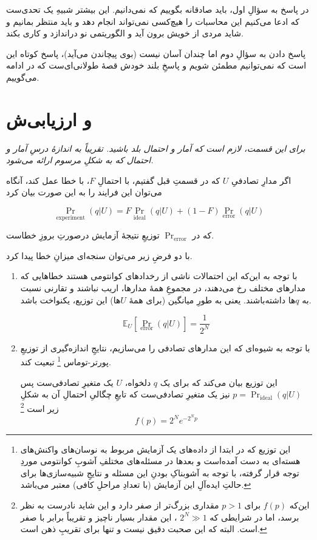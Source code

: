 \documentclass[11pt]{article}
\begin{document}
در پاسخ به سؤالِ اول، باید صادقانه بگوییم که نمی‌دانیم.
\cite{aaronson}
این بیشتر شبیهِ یک تحدی‌ست که ادعا می‌کنیم این محاسبات را هیچ‌کسی نمی‌تواند انجام دهد و باید منتظر بمانیم و شاید مردی از خویش برون آید و الگوریتمی نو دراندازد و کاری بکند.

پاسخ دادن به سؤالِ دوم اما چندان آسان نیست (بوی پیچاندن می‌آید)، پاسخ کوتاه این است که نمی‌توانیم مطمئن شویم \cite{aaronsonfaq} و پاسخِ بلند خودش قصهٔ طولانی‌ای‌ست که در ادامه می‌گوییم.
\section{و ارزیابی‌ش}
\begin{center}
\begin{minipage}[H]{0.6\textwidth}
\emph{
برای این قسمت، لازم است که آمار و احتمال بلد باشید. تقریباً به اندازهٔ درسِ آمار و احتمال که به شکلِ مرسوم ارائه می‌شود.
}
\end{minipage}
\end{center}
اگر مدارِ تصادفیِ $U$ که در قسمتِ قبل گفتیم، با احتمالِ $F$، با خطا عمل کند، آنگاه می‌توان این فرایند را به این صورت بیان کرد

\[ \Pr_\text{experiment}(q|U) = F \Pr_\text{ideal}(q|U) + (1 - F) \Pr_\text{error}(q|U) \]

که در $\Pr_\text{error}$ توزیعِ نتیجهٔ آزمایش درصورتِ بروزِ خطاست.

با دو فرضِ  زیر می‌توان سنجه‌ای میزانِ خطا پیدا کرد.
\begin{enumerate}[-]
\item
با توجه به این‌که این احتمالات ناشی از رخدادهای کوانتومی هستند خطاهایی که مدارهای مختلف رخ می‌دهند، در مجموعِ همهٔ مدارها، اریب نباشند و تقارنی نسبت به $q$ها داشته‌باشند. یعنی به طورِ میانگین (برای همهٔ $U$ها) این توزیع، یکنواخت باشد. \cite{google}

\[ \mathbb{E}_U[\Pr_\text{error}(q|U)] = \frac{1}{2^N} \]

\item
با توجه به شیوه‌ای که این مدارهای تصادفی را می‌سازیم، نتایجِ اندازه‌گیری از توزیعِ پورتر-توماس
\footnote{
این توزیع که در ابتدا از داده‌های یک آزمایش مربوط به نوسان‌های واکنش‌های هسته‌ای به دست آمده‌است \cite{porter} و بعدها در مسئله‌های مختلفِ آشوبِ کوانتومی موردِ توجه قرار گرفته، با توجه به آشوبناکِ بودنِ این مسئله و نتایجِ شبیه‌سازی‌ها \cite{boxio} برای حالتِ ایده‌آلِ این آزمایش (با تعدادِ مراحلِ کافی) معتبر می‌باشد.
} تبعیت کند.

این توزیع بیان می‌کند که برای یک $q$ دلخواه، $U$ یک متغیرِ تصادفی‌ست پس $p = \Pr_\text{ideal}(q|U)$ نیز یک متغیرِ تصادفی‌ست که تابعِ چگالیِ احتمالِ آن به شکلِ زیر است
\footnote{
این‌که $f(p)$ برای $p > 1$ مقداری بزرگ‌تر از صفر دارد و این شاید نادرست به نظر برسد، اما در شرایطی که $2^N \gg 1$ \cite{google}، این مقدار بسیار ناچیز و تقریباً برابر با صفر است. البته که این صحبت دقیق نیست و تنها برای تقریبِ ذهن است.
}
\[ f(p) = 2^N e^{-2^N p}  \]
\end{enumerate}
\end{document}

